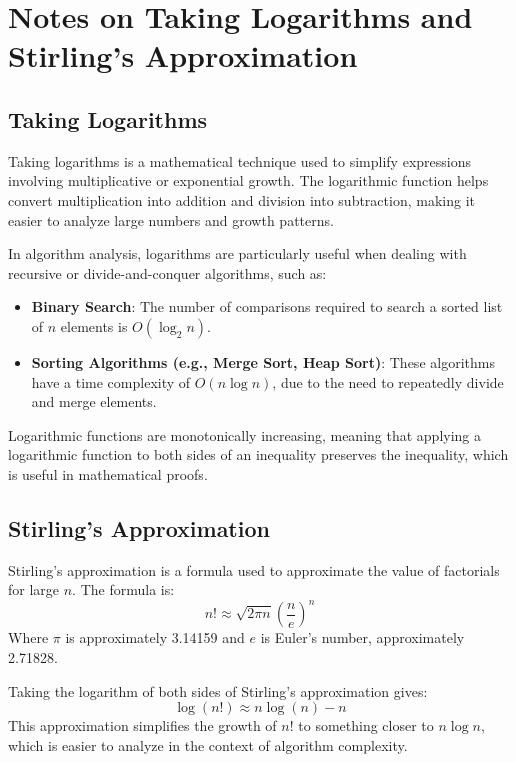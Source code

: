 \documentclass{article}
\begin{document}
\section{Notes on Taking Logarithms and Stirling's Approximation}

\subsection{Taking Logarithms}
Taking logarithms is a mathematical technique used to simplify expressions involving multiplicative or exponential growth. The logarithmic function helps convert multiplication into addition and division into subtraction, making it easier to analyze large numbers and growth patterns.

In algorithm analysis, logarithms are particularly useful when dealing with recursive or divide-and-conquer algorithms, such as:
\begin{itemize}
    \item \textbf{Binary Search}: The number of comparisons required to search a sorted list of \( n \) elements is \( O(\log_2 n) \).
    \item \textbf{Sorting Algorithms (e.g., Merge Sort, Heap Sort)}: These algorithms have a time complexity of \( O(n \log n) \), due to the need to repeatedly divide and merge elements.
\end{itemize}

Logarithmic functions are monotonically increasing, meaning that applying a logarithmic function to both sides of an inequality preserves the inequality, which is useful in mathematical proofs.

\subsection{Stirling's Approximation}
Stirling's approximation is a formula used to approximate the value of factorials for large \( n \). The formula is:
\[
n! \approx \sqrt{2 \pi n} \left(\frac{n}{e}\right)^n
\]
Where \( \pi \) is approximately 3.14159 and \( e \) is Euler's number, approximately 2.71828.

Taking the logarithm of both sides of Stirling's approximation gives:
\[
\log(n!) \approx n \log(n) - n
\]
This approximation simplifies the growth of \( n! \) to something closer to \( n \log n \), which is easier to analyze in the context of algorithm complexity.
\end{document}
